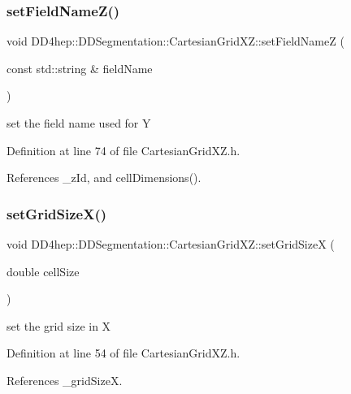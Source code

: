 \subsubsection{\texorpdfstring{set\+Field\+Name\+Z()}{setFieldNameZ()}}
{\footnotesize\ttfamily void D\+D4hep\+::\+D\+D\+Segmentation\+::\+Cartesian\+Grid\+X\+Z\+::set\+Field\+NameZ (\begin{DoxyParamCaption}\item[{const std\+::string \&}]{field\+Name }\end{DoxyParamCaption})\hspace{0.3cm}{\ttfamily [inline]}}



set the field name used for Y 



Definition at line 74 of file Cartesian\+Grid\+X\+Z.\+h.



References \+\_\+z\+Id, and cell\+Dimensions().

\hypertarget{class_d_d4hep_1_1_d_d_segmentation_1_1_cartesian_grid_x_z_af1370288c6bf2194666a6faa4f6bd563}{}\label{class_d_d4hep_1_1_d_d_segmentation_1_1_cartesian_grid_x_z_af1370288c6bf2194666a6faa4f6bd563} 
\subsubsection{\texorpdfstring{set\+Grid\+Size\+X()}{setGridSizeX()}}
{\footnotesize\ttfamily void D\+D4hep\+::\+D\+D\+Segmentation\+::\+Cartesian\+Grid\+X\+Z\+::set\+Grid\+SizeX (\begin{DoxyParamCaption}\item[{double}]{cell\+Size }\end{DoxyParamCaption})\hspace{0.3cm}{\ttfamily [inline]}}



set the grid size in X 



Definition at line 54 of file Cartesian\+Grid\+X\+Z.\+h.



References \+\_\+grid\+SizeX.

